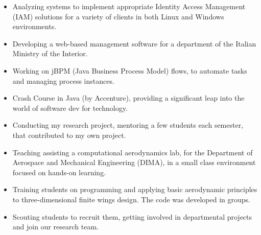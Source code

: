 	\divider

	\newline
	\begin{itemize}
		\item Analyzing systems to implement appropriate Identity Access Management (IAM) solutions for a variety of clients in both Linux and Windows environments.
	\end{itemize}

	\divider

	\newline
	\begin{itemize}
		\item Developing a web-based management software for a department of the Italian Ministry of the Interior.
		\item Working on jBPM (Java Business Process Model) flows, to automate tasks and managing process instances.
	\end{itemize}

	\medskip

	\newline
	\begin{itemize}
		\item Crash Course in Java (by Accenture), providing a significant leap into the world of software dev for technology.
	\end{itemize}

	\divider

	\begin{itemize}
		\item Conducting my research project, mentoring a few students each semester, that contributed to my own project.
	\end{itemize}
	\smallskip

	\medskip

	\newline
	\begin{itemize}
		\item Teaching assisting a computational aerodynamics lab, for the Department of Aerospace and Mechanical Engineering (DIMA), in a small class environment focused on hands-on learning.
		\item Training students on programming and applying basic aerodynamic principles to three-dimensional finite wings design. The code was developed in groups.
		\item Scouting students to recruit them, getting involved in departmental projects and join our research team.
	\end{itemize}
	\medskip

